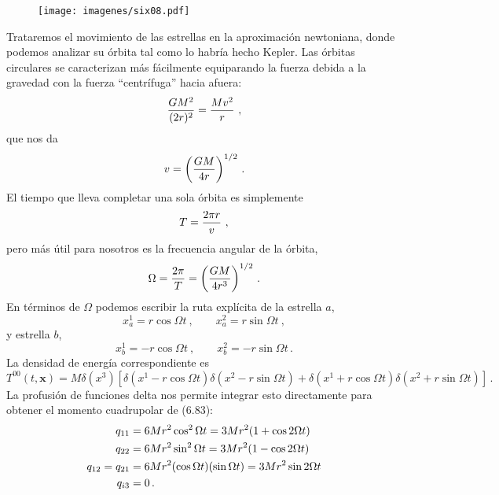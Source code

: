 \documentclass[11pt,b5paper,openany,twoside]{book}
\def\x{\mathbf{x}}
\begin{document}
\begin{figure}[h]
\centering
\texttt{[image: imagenes/six08.pdf]}
\end{figure}

\noindent
Trataremos el movimiento de las estrellas en la aproximación newtoniana, donde podemos analizar su órbita tal como lo habría hecho Kepler.
Las órbitas circulares se caracterizan más fácilmente equiparando la fuerza debida a la gravedad con la fuerza ``centrífuga'' hacia afuera:
\begin{equation}
{{GM^2}\over{(2r)^2}} = {{Mv^2}\over r}\ ,\label{6.86}
\end{equation}
que nos da
\begin{equation}
v=\left( {{GM}\over{4r}}\right)^{1/2}\,.\label{6.87}
\end{equation}
El tiempo que lleva completar una sola órbita es simplemente
\begin{equation}
T = {{2\pi r}\over v}\ ,\label{6.88}
\end{equation}
pero más útil para nosotros es la frecuencia angular de la órbita,
\begin{equation}
\Omega = {{2\pi}\over T} = \left( {{GM}\over{4r^3}}\right)^{1/2}
\,.\label{6.89}
\end{equation}
En términos de $\Omega$ podemos escribir la ruta explícita de la estrella $a$,
\begin{equation}
x^1_a = r\cos\Omega t\ ,\qquad x^2_a = r\sin\Omega t\ ,\label{6.90}
\end{equation}
y estrella $b$,
\begin{equation}
x^1_b = -r\cos\Omega t\ ,\qquad x^2_b =-r\sin\Omega t\,.\label{6.91}
\end{equation}
La densidad de energía correspondiente es
\begin{equation}
T^{00}(t,\x) = M\delta(x^3)\left[\delta(x^1-r\cos\Omega t)
\delta(x^2-r\sin\Omega t) + \delta(x^1+r\cos\Omega t)
\delta(x^2+r\sin\Omega t)\right]\,.\label{6.92}
\end{equation}
La profusión de funciones delta nos permite integrar esto directamente para obtener el momento cuadrupolar de (6.83):
\begin{align}
q_{11}  &=  6Mr^2\cos^2\Omega t = 3Mr^2(1+\cos2\Omega t) \notag \\
q_{22}  &=  6Mr^2\sin^2\Omega t = 3Mr^2(1-\cos2\Omega t) \notag \\
q_{12} =q_{21}  &=  6Mr^2(\cos\Omega t)(\sin\Omega t) =
3Mr^2\sin2\Omega t \notag \\  q_{i3}  &=  0\,.\label{6.93}
\end{align}
\end{document}
